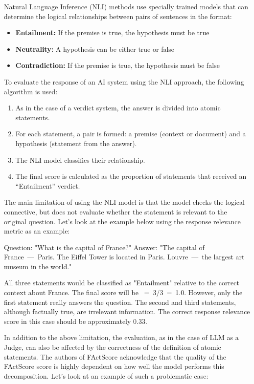 \documentclass[sn-basic]{sn-jnl}
\theoremstyle{thmstyleone}%
\theoremstyle{thmstyletwo}%
\theoremstyle{thmstylethree}%
\begin{document}
Natural Language Inference (NLI) methods use specially trained models that can determine the logical relationships between pairs of sentences in the format: 
\begin{itemize} 
\item \textbf{Entailment:} If the premise is true, the hypothesis must be true 
\item \textbf{Neutrality:} A hypothesis can be either true or false 
\item \textbf{Contradiction:} If the premise is true, the hypothesis must be false 
\end{itemize}

To evaluate the response of an AI system using the NLI approach, the following algorithm is used:

\begin{enumerate} 
\item As in the case of a verdict system, the answer is divided into atomic statements. 
\item For each statement, a pair is formed: a premise (context or document) and a hypothesis (statement from the answer). 
\item The NLI model classifies their relationship. 
\item The final score is calculated as the proportion of statements that received an ``Entailment'' verdict. 
\end{enumerate}

The main limitation of using the NLI model is that the model checks the logical connective, but does not evaluate whether the statement is relevant to the original question. Let's look at the example below using the response relevance metric as an example:

Question: "What is the capital of France?" 
Answer: "The capital of France~---~Paris. The Eiffel Tower is located in Paris. Louvre~---~the largest art museum in the world."

All three statements would be classified as "Entailment" relative to the correct context about France. The final score will be ~=~3/3~=~1.0. However, only the first statement really answers the question. The second and third statements, although factually true, are irrelevant information. The correct response relevance score in this case should be approximately 0.33.

In addition to the above limitation, the evaluation, as in the case of LLM as a Judge, can also be affected by the correctness of the definition of atomic statements. The authors of FActScore \cite{Min2023} acknowledge that the quality of the FActScore score is highly dependent on how well the model performs this decomposition. Let's look at an example of such a problematic case:
\end{document}
